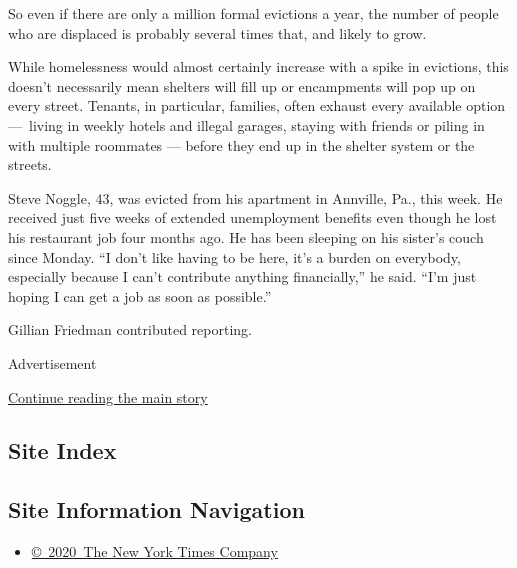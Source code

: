 So even if there are only a million formal evictions a year, the number
of people who are displaced is probably several times that, and likely
to grow.

While homelessness would almost certainly increase with a spike in
evictions, this doesn't necessarily mean shelters will fill up or
encampments will pop up on every street. Tenants, in particular,
families, often exhaust every available option ---~living in weekly
hotels and illegal garages, staying with friends or piling in with
multiple roommates --- before they end up in the shelter system or the
streets.

Steve Noggle, 43, was evicted from his apartment in Annville, Pa., this
week. He received just five weeks of extended unemployment benefits even
though he lost his restaurant job four months ago. He has been sleeping
on his sister's couch since Monday. ``I don't like having to be here,
it's a burden on everybody, especially because I can't contribute
anything financially,'' he said. ``I'm just hoping I can get a job as
soon as possible.''

Gillian Friedman contributed reporting.

Advertisement

\protect\hyperlink{after-bottom}{Continue reading the main story}

\hypertarget{site-index}{%
\subsection{Site Index}\label{site-index}}

\hypertarget{site-information-navigation}{%
\subsection{Site Information
Navigation}\label{site-information-navigation}}

\begin{itemize}
\tightlist
\item
  \href{https://help.nytimes3xbfgragh.onion/hc/en-us/articles/115014792127-Copyright-notice}{©~2020~The
  New York Times Company}
\end{itemize}

